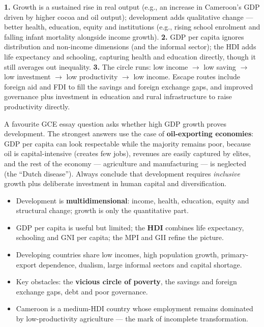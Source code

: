 \documentclass[11pt]{article}
\begin{document}
\begin{corrige}[Exercise 1]
\textbf{1.} Growth is a sustained rise in real output (e.g., an increase in Cameroon's GDP driven by higher cocoa and oil output); development adds qualitative change — better health, education, equity and institutions (e.g., rising school enrolment and falling infant mortality alongside income growth). \textbf{2.} GDP per capita ignores distribution and non-income dimensions (and the informal sector); the HDI adds life expectancy and schooling, capturing health and education directly, though it still averages out inequality. \textbf{3.} The circle runs: low income $\rightarrow$ low saving $\rightarrow$ low investment $\rightarrow$ low productivity $\rightarrow$ low income. Escape routes include foreign aid and FDI to fill the savings and foreign exchange gaps, and improved governance plus investment in education and rural infrastructure to raise productivity directly.
\end{corrige}

\begin{attention}
A favourite GCE essay question asks whether high GDP growth proves development. The strongest answers use the case of \textbf{oil-exporting economies}: GDP per capita can look respectable while the majority remains poor, because oil is capital-intensive (creates few jobs), revenues are easily captured by elites, and the rest of the economy — agriculture and manufacturing — is neglected (the ``Dutch disease''). Always conclude that development requires \emph{inclusive} growth plus deliberate investment in human capital and diversification.
\end{attention}

\begin{aretenir}
\begin{itemize}
\item Development is \textbf{multidimensional}: income, health, education, equity and structural change; growth is only the quantitative part.
\item GDP per capita is useful but limited; the \textbf{HDI} combines life expectancy, schooling and GNI per capita; the MPI and GII refine the picture.
\item Developing countries share low incomes, high population growth, primary-export dependence, dualism, large informal sectors and capital shortage.
\item Key obstacles: the \textbf{vicious circle of poverty}, the savings and foreign exchange gaps, debt and poor governance.
\item Cameroon is a medium-HDI country whose employment remains dominated by low-productivity agriculture — the mark of incomplete transformation.
\end{itemize}
\end{aretenir}
\end{document}

